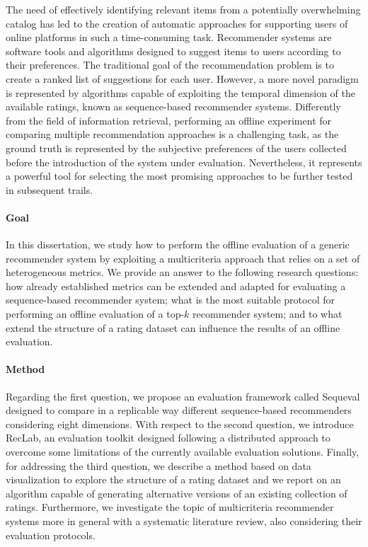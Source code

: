 The need of effectively identifying relevant items from a potentially overwhelming catalog has led to the creation of automatic approaches for supporting users of online platforms in such a time-consuming task. Recommender systems are software tools and algorithms designed to suggest items to users according to their preferences. The traditional goal of the recommendation problem is to create a ranked list of suggestions for each user. However, a more novel paradigm is represented by algorithms capable of exploiting the temporal dimension of the available ratings, known as sequence-based recommender systems. Differently from the field of information retrieval, performing an offline experiment for comparing multiple recommendation approaches is a challenging task, as the ground truth is represented by the subjective preferences of the users collected before the introduction of the system under evaluation. Nevertheless, it represents a powerful tool for selecting the most promising approaches to be further tested in subsequent trails.

\paragraph{Goal}

In this dissertation, we study how to perform the offline evaluation of a generic recommender system by exploiting a multicriteria approach that relies on a set of heterogeneous metrics. We provide an answer to the following research questions: how already established metrics can be extended and adapted for evaluating a sequence-based recommender system; what is the most suitable protocol for performing an offline evaluation of a top-$k$ recommender system; and to what extend the structure of a rating dataset can influence the results of an offline evaluation.

\paragraph{Method}

Regarding the first question, we propose an evaluation framework called Sequeval designed to compare in a replicable way different sequence-based recommenders considering eight dimensions. With respect to the second question, we introduce RecLab, an evaluation toolkit designed following a distributed approach to overcome some limitations of the currently available evaluation solutions. Finally, for addressing the third question, we describe a method based on data visualization to explore the structure of a rating dataset and we report on an algorithm capable of generating alternative versions of an existing collection of ratings. Furthermore, we investigate the topic of multicriteria recommender systems more in general with a systematic literature review, also considering their evaluation protocols.

